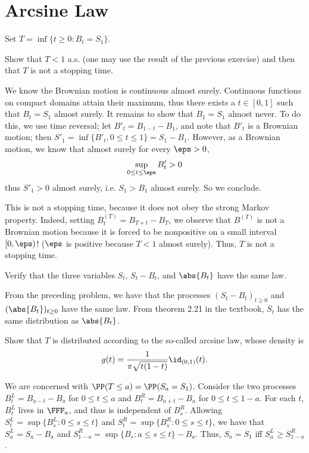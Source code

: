 \documentclass{scrartcl}
\begin{document}
\section{Arcsine Law}
\begin{prob*}
    Set $T = \inf\{t \geq 0: B_t = S_1\}$.
\end{prob*}
\begin{prob}
    Show that $T < 1$ a.s. (one may use the result of the previous exercise) and then that $T$ is not a stopping time.
\end{prob}

We know the Brownian motion is continuous almost surely. Continuous functions on compact domains attain their maximum, thus there exists a $t\in [0,1]$ such that $B_t = S_1$ almost surely. It remains to show that $B_1 = S_1$ almost never. To do this, we use time reversal; let $B'_t = B_{1-t} - B_1$, and note that $B'_t$ is a Brownian motion; then $S'_1 = \inf\{B'_t, 0 \leq t \leq 1\} = S_1 - B_1$. However, as a Brownian motion, we know that almost surely for every $\eps > 0$,
\[
    \sup_{0 \leq t \leq \eps} B'_t > 0
\]
thus $S'_1 > 0$ almost surely, i.e. $S_1 > B_1$ almost surely. So we conclude.

This is not a stopping time, because it does not obey the strong Markov property. Indeed, setting $B^{(T)}_t = B_{T + t} - B_T$, we observe that $B^{(T)}$ is not a Brownian motion because it is forced to be nonpositive on a small interval $[0,\eps)$! ($\eps$ is positive because $T < 1$ almost surely). Thus, $T$ is not a stopping time.


\begin{prob}
    Verify that the three variables $S_t$, $S_t - B_t$, and $\abs{B_t}$ have the same law.
\end{prob}

From the preceding problem, we have that the processes $(S_t - B_t)_{t\geq 0}$ and $(\abs{B_t})_{t\geq 0}$ have the same law. From theorem 2.21 in the textbook, $S_t$ has the same distribution as $\abs{B_t}$.

\begin{prob}
    Show that $T$ is distributed according to the so-called arcsine law, whose density is
    \[
        g(t) = \frac{1}{\pi\sqrt{t(1-t)}} \id_{(0,1)}(t).
    \]
\end{prob}
We are concerned with $\PP(T \leq a) = \PP(S_a = S_1)$. Consider the two processes $B^L_t = B_{a - t} - B_a$ for $0\leq t\leq a$ and $B^R_t = B_{a + t} - B_a$ for $0\leq t \leq 1 - a$. For each $t$, $B^L_t$ lives in $\FFF_a$, and thus is independent of $B^R_s$. Allowing $S^L_t = \sup\{B^L_s: 0\leq s\leq t\}$ and $S^R_t = \sup\{B^R_s: 0\leq s\leq t\}$, we have that $S^L_a = S_a - B_a$ and $S^R_{1 - a} =\sup\{B_s: a\leq s\leq t\} - B_a$. Thus, $S_a = S_1$ iff $S^L_a \geq S^R_{1-a}$.
\end{document}
